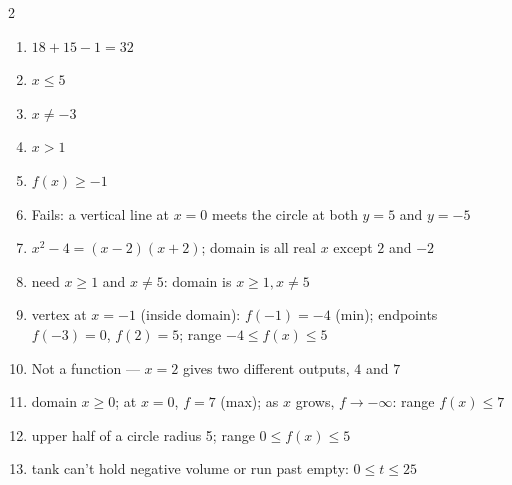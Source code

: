 \documentclass[11pt]{article}
\begin{document}
\begin{keybox}
\begin{multicols}{2}
\small
\begin{enumerate}[leftmargin=*,itemsep=3pt]
  \item $18+15-1=32$
  \item $x\leq5$
  \item $x\neq-3$
  \item $x>1$
  \item $f(x)\geq-1$
  \item Fails: a vertical line at $x=0$ meets the circle at both $y=5$ and $y=-5$
  \item $x^2-4=(x-2)(x+2)$; domain is all real $x$ except $2$ and $-2$
  \item need $x\geq1$ and $x\neq5$: domain is $x\geq1,x\neq5$
  \item vertex at $x=-1$ (inside domain): $f(-1)=-4$ (min); endpoints $f(-3)=0$, $f(2)=5$; range $-4\leq f(x)\leq5$
  \item Not a function --- $x=2$ gives two different outputs, $4$ and $7$
  \item domain $x\geq0$; at $x=0$, $f=7$ (max); as $x$ grows, $f\to-\infty$: range $f(x)\leq7$
  \item upper half of a circle radius 5; range $0\leq f(x)\leq5$
  \item tank can't hold negative volume or run past empty: $0\leq t\leq25$
\end{enumerate}
\end{multicols}
\end{keybox}
\end{document}
